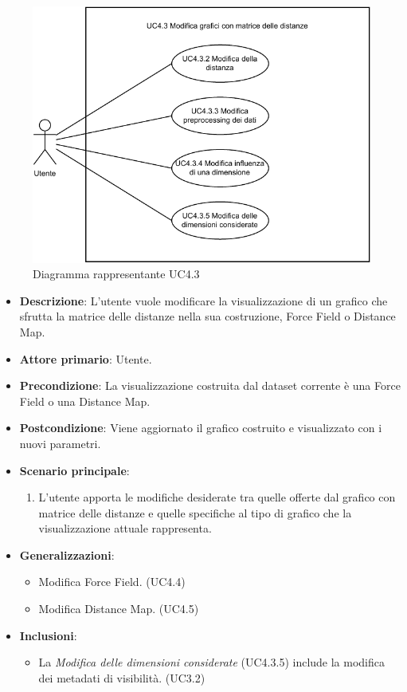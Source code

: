 \begin{figure}[h]
    \centering
    \includegraphics[width=0.8  \textwidth]{componenti/casi-duso/diagrammi/UC4_3.pdf}
    \caption{Diagramma rappresentante UC4.3}
    \label{fig:UC4.3}
\end{figure}

\begin{itemize}
    \item \textbf{Descrizione}: L’utente vuole modificare la visualizzazione di un grafico che sfrutta la matrice delle distanze
                                nella sua costruzione, Force Field o Distance Map.
    \item \textbf{Attore primario}: Utente.
    \item \textbf{Precondizione}: La visualizzazione costruita dal dataset corrente è una Force Field o una Distance Map. 
    \item \textbf{Postcondizione}: Viene aggiornato il grafico costruito e visualizzato con i nuovi parametri.
    \item \textbf{Scenario principale}:
    \begin{enumerate}
        \item   L’utente apporta le modifiche desiderate tra quelle offerte dal grafico con matrice
                delle distanze e quelle specifiche al tipo di grafico che la visualizzazione attuale rappresenta.
    \end{enumerate}
    \item \textbf{Generalizzazioni}:
    \begin{itemize}
        \item Modifica Force Field. (UC4.4)
        \item Modifica Distance Map. (UC4.5)
    \end{itemize}
    
    \item \textbf{Inclusioni}:
    \begin{itemize} 
        \item La \emph{Modifica delle dimensioni considerate} (UC4.3.5) include la modifica dei metadati di visibilità. (UC3.2)
    \end{itemize}
\end{itemize}

